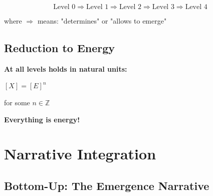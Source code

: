 	\begin{equation}
		\text{Level 0} \Rightarrow \text{Level 1} \Rightarrow \text{Level 2} \Rightarrow \text{Level 3} \Rightarrow \text{Level 4}
	\end{equation}
	
	where $\Rightarrow$ means: "determines" or "allows to emerge"
	
	\subsection{Reduction to Energy}
	
	\begin{center}
		\textbf{At all levels holds in natural units:}
		
		\vspace{0.3cm}
		
		 $[X] = [E]^n$
		
		\vspace{0.3cm}
		
		\normalsize for some $n \in \mathbb{Z}$
	\end{center}
	
	\textbf{Everything is energy!}
	
	\section{Narrative Integration}
	
	\subsection{Bottom-Up: The Emergence Narrative}
	
